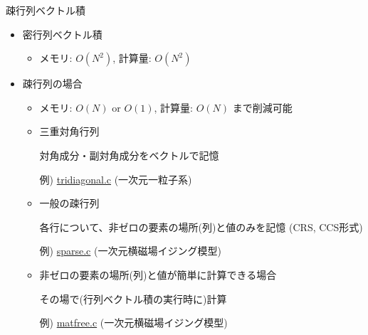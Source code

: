 \begin{frame}[t,fragile]{疎行列ベクトル積}
  \begin{itemize}
  \item 密行列ベクトル積
    \begin{itemize}
    \item メモリ: $O(N^2)$, 計算量: $O(N^2)$
    \end{itemize}
  \item 疎行列の場合
    \begin{itemize}
    \item メモリ: $O(N)$ or $O(1)$, 計算量: $O(N)$ まで削減可能
    \item 三重対角行列

      対角成分・副対角成分をベクトルで記憶

      例) \href{https://github.com/todo-group/computer-experiments/blob/master/exercise/eigenvalue_problem/tridiagonal.c}{tridiagonal.c} (一次元一粒子系)

    \item 一般の疎行列

      各行について、非ゼロの要素の場所(列)と値のみを記憶 (CRS, CCS形式)

      例) \href{https://github.com/todo-group/computer-experiments/blob/master/exercise/eigenvalue_problem/sparse.c}{sparse.c} (一次元横磁場イジング模型)

    \item 非ゼロの要素の場所(列)と値が簡単に計算できる場合

      その場で(行列ベクトル積の実行時に)計算

      例) \href{https://github.com/todo-group/computer-experiments/blob/master/exercise/eigenvalue_problem/matfree.c}{matfree.c} (一次元横磁場イジング模型)
    \end{itemize}
  \end{itemize}
\end{frame}
